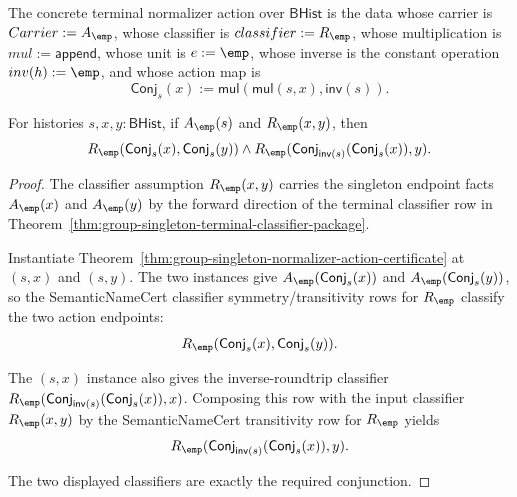 \begin{definition}
\label{def:group-singleton-normalizer-action-instance}
The concrete terminal normalizer action over $\mathsf{BHist}$ is the data
whose carrier is $Carrier:=A_{\emp}$, whose classifier is
$classifier:=R_{\emp}$, whose multiplication is $mul:=\mathsf{append}$, whose
unit is $e:=\emp$, whose inverse is the constant operation
$inv(h):=\emp$, and whose action map is
$$
\mathsf{Conj}_s(x):=\mathsf{mul}(\mathsf{mul}(s,x),\mathsf{inv}(s)).
$$
\end{definition}

\begin{theorem}
\label{thm:group-singleton-normalizer-action-classifier-determinacy}
For histories $s,x,y:\mathsf{BHist}$, if $A_{\emp}(s)$ and
$R_{\emp}(x,y)$, then
$$
R_{\emp}(\mathsf{Conj}_s(x),\mathsf{Conj}_s(y))\land
R_{\emp}(\mathsf{Conj}_{\mathsf{inv}(s)}(\mathsf{Conj}_s(x)),y).
$$
\end{theorem}
\begin{proof}
The classifier assumption $R_{\emp}(x,y)$ carries the singleton endpoint facts
$A_{\emp}(x)$ and $A_{\emp}(y)$ by the forward direction of the terminal
classifier row in
Theorem~\ref{thm:group-singleton-terminal-classifier-package}.

Instantiate Theorem~\ref{thm:group-singleton-normalizer-action-certificate}
at $(s,x)$ and $(s,y)$. The two instances give
$A_{\emp}(\mathsf{Conj}_s(x))$ and
$A_{\emp}(\mathsf{Conj}_s(y))$, so the SemanticNameCert classifier
symmetry/transitivity rows for $R_{\emp}$ classify the two action endpoints:
$$
R_{\emp}(\mathsf{Conj}_s(x),\mathsf{Conj}_s(y)).
$$

The $(s,x)$ instance also gives the inverse-roundtrip classifier
$R_{\emp}(\mathsf{Conj}_{\mathsf{inv}(s)}(\mathsf{Conj}_s(x)),x)$.
Composing this row with the input classifier $R_{\emp}(x,y)$ by the
SemanticNameCert transitivity row for $R_{\emp}$ yields
$$
R_{\emp}(\mathsf{Conj}_{\mathsf{inv}(s)}(\mathsf{Conj}_s(x)),y).
$$

The two displayed classifiers are exactly the required conjunction.
\end{proof}

